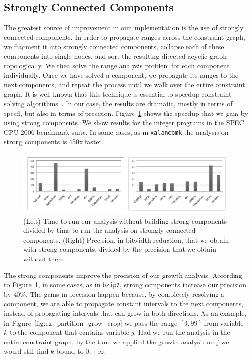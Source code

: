 \documentclass[preprint]{elsarticle}
\begin{document}
\subsection{Strongly Connected Components}
\label{sub:sccs}

The greatest source of improvement in our implementation is the use of strongly
connected components.
In order to propagate ranges across the constraint graph, we fragment it
into strongly connected components, collapse each of these components into
single nodes, and sort the resulting directed acyclic graph topologically.
We then solve the range analysis problem for each component individually.
Once we have solved a component, we propagate its ranges to the next
components, and repeat the process until we walk over the entire constraint
graph.
It is well-known that this technique is essential to speedup constraint solving
algorithms~\cite[Sec 6.3]{Nielson99}.
In our case, the results are dramatic, mostly in terms of speed, but also in
terms of precision.
Figure~\ref{fig:impactSCC} shows the speedup that we gain by using strong
components.
We show results for the integer programs in the SPEC CPU 2006 benchmark suite.
In some cases, as in \texttt{xalancbmk} the analysis on strong components is
450x faster.

\begin{figure}[t!]
\begin{center}
\includegraphics[width=\textwidth]{images/impactSCC}
\end{center}
\caption{\label{fig:impactSCC}
(Left) Time to run our analysis without building strong components
divided by time to run the analysis on strongly connected components.
(Right) Precision, in bitwidth reduction, that we obtain with strong
components, divided by the precision that we obtain without them.
}
\end{figure}

The strong components improve the precision of our growth analysis.
According to Figure~\ref{fig:impactSCC}, in some cases, as in \texttt{bzip2},
strong components increase our precision by 40\%.
The gains in precision happen because, by completely resolving a component,
we are able to propagate constant intervals to the next components, instead
of propagating intervals that can grow in both directions.
As an example, in Figure~\ref{fig:ex_partition_grow_crop} we pass the range
$[0, 99]$ from variable $k$ to the component that contains variable $j$.
Had we run the analysis in the entire constraint graph, by the time we
applied the growth analysis on $j$ we would still find $k$ bound to
$0, +\infty$.
\end{document}
